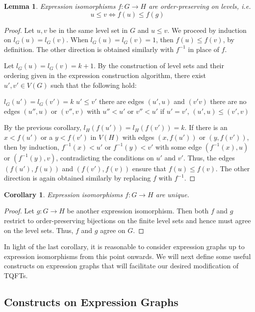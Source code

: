\documentclass{amsart}
\renewcommand{\to}[1][]{\stackrel{#1}{\longrightarrow}}
\newcommand{\li}[1][]{\ifthenelse{\equal{#1}{}}{\item}{\item \label{#1}}}
\newenvironment{enmrt}{
  \enumerate[(i)]
  \setlength{\itemsep}{0pt}
}{
  \endenumerate
}
\numberwithin{thm}{section}
\newtheorem{lem}[thm]{Lemma}
\newtheorem{cor}[thm]{Corollary}
\theoremstyle{definition}
\begin{document}
\begin{lem}
Expression isomorphisms $f : G \to H$ are order-preserving on levels, i.e.
\[
  u \leq v \iff f(u) \leq f(g)
\]
\end{lem}
\begin{proof}
Let $u, v$ be in the same level set in $G$ and $u \leq v$. We proceed by
induction on $l_G(u) = l_G(v)$. When $l_G(u) = l_G(v) = 1$, then
$f(u) \leq f(v)$, by definition. The other direction is obtained similarly with
$f^{-1}$ in place of $f$.

Let $l_G(u) = l_G(v) = k + 1$. By the construction of level sets and their
ordering given in the expression construction algorithm, there exist
$u', v' \in V(G)$ such that the following hold:
\begin{enmrt}
\li $l_G(u') = l_G(v') = k$
\li $u' \leq v'$
\li there are edges $(u', u)$ and $(v' v)$
\li there are no edges $(u'', u)$ or $(v'', v)$ with $u'' < u'$ or $v'' < u'$
\li if $u' = v'$, $(u', u) \leq (v', v)$
\end{enmrt}
By the previous corollary, $l_H(f(u')) = l_H(f(v')) = k$.
If there is an $x < f(u')$ or a $y < f(v')$ in $V(H)$ with edges
$(x, f(u'))$ or $(y, f(v'))$, then by induction, $f^{-1}(x) < u'$ or
$f^{-1}(y) < v'$ with some edge $(f^{-1}(x), u)$ or $(f^{-1}(y), v)$,
contradicting the conditions on $u'$ and $v'$. Thus, the edges $(f(u'), f(u))$
and $(f(v'), f(v))$ ensure that $f(u) \leq f(v)$. The other direction is again
obtained similarly by replacing $f$ with $f^{-1}$.
\end{proof}

\begin{cor}\label{cor:expiso_unique}
Expression isomorphisms $f : G \to H$ are unique.
\end{cor}
\begin{proof}
Let $g : G \to H$ be another expression isomorphism. Then both $f$ and $g$
restrict to order-preserving bijections on the finite level sets and hence must
agree on the level sets. Thus, $f$ and $g$ agree on $G$.
\end{proof}

In light of the last corollary, it is reasonable to consider expression graphs
up to expression isomorphisms from this point onwards. We will next define some
useful constructs on expression graphs that will facilitate our desired
modification of TQFTs.


%

\subsection{Constructs on Expression Graphs}
\end{document}
